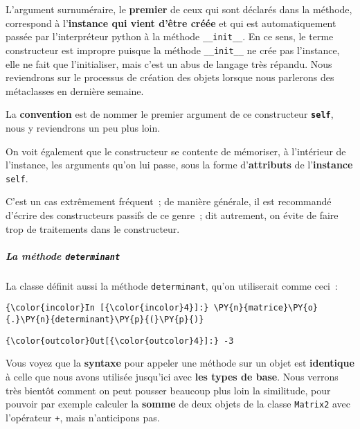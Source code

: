 L'argument surnuméraire, le \textbf{premier} de ceux qui sont déclarés
dans la méthode, correspond à l'\textbf{instance qui vient d'être créée}
et qui est automatiquement passée par l'interpréteur python à la méthode
\texttt{\_\_init\_\_}. En ce sens, le terme constructeur est impropre
puisque la méthode \texttt{\_\_init\_\_} ne crée pas l'instance, elle ne
fait que l'initialiser, mais c'est un abus de langage très répandu. Nous
reviendrons sur le processus de création des objets lorsque nous
parlerons des métaclasses en dernière semaine.

La \textbf{convention} est de nommer le premier argument de ce
constructeur \textbf{\texttt{self}}, nous y reviendrons un peu plus
loin.

    On voit également que le constructeur se contente de mémoriser, à
l'intérieur de l'instance, les arguments qu'on lui passe, sous la forme
d'\textbf{attributs} de l'\textbf{instance} \texttt{self}.

C'est un cas extrêmement fréquent~; de manière générale, il est
recommandé d'écrire des constructeurs passifs de ce genre~; dit
autrement, on évite de faire trop de traitements dans le constructeur.

    \hypertarget{la-muxe9thode-determinant}{%
\subparagraph{\texorpdfstring{La méthode
\texttt{determinant}}{La méthode determinant}}\label{la-muxe9thode-determinant}}

    La classe définit aussi la méthode \texttt{determinant}, qu'on
utiliserait comme ceci~:

    \begin{Verbatim}[commandchars=\\\{\}]
{\color{incolor}In [{\color{incolor}4}]:} \PY{n}{matrice}\PY{o}{.}\PY{n}{determinant}\PY{p}{(}\PY{p}{)}
\end{Verbatim}


\begin{Verbatim}[commandchars=\\\{\}]
{\color{outcolor}Out[{\color{outcolor}4}]:} -3
\end{Verbatim}
            
    Vous voyez que la \textbf{syntaxe} pour appeler une méthode sur un objet
est \textbf{identique} à celle que nous avons utilisée jusqu'ici avec
\textbf{les types de base}. Nous verrons très bientôt comment on peut
pousser beaucoup plus loin la similitude, pour pouvoir par exemple
calculer la \textbf{somme} de deux objets de la classe \texttt{Matrix2}
avec l'opérateur \texttt{+}, mais n'anticipons pas.

